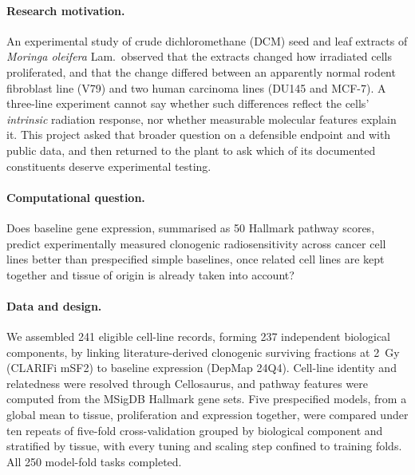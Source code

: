 \label{ch:summary}

\paragraph{Research motivation.}
An experimental study of crude dichloromethane (DCM) seed and leaf extracts of
\textit{Moringa oleifera} Lam.\ observed that the extracts changed how irradiated cells
proliferated, and that the change differed between an apparently normal rodent fibroblast
line (V79) and two human carcinoma lines (DU145 and MCF-7). A three-line experiment cannot
say whether such differences reflect the cells' \emph{intrinsic} radiation response, nor
whether measurable molecular features explain it. This project asked that broader question
on a defensible endpoint and with public data, and then returned to the plant to ask which
of its documented constituents deserve experimental testing.

\paragraph{Computational question.}
Does baseline gene expression, summarised as 50 Hallmark pathway scores, predict
experimentally measured clonogenic radiosensitivity across cancer cell lines better than
prespecified simple baselines, once related cell lines are kept together and tissue of
origin is already taken into account?

\paragraph{Data and design.}
We assembled 241 eligible cell-line records, forming 237 independent biological components,
by linking literature-derived clonogenic surviving fractions at 2~Gy (CLARIFi mSF2) to
baseline expression (DepMap 24Q4). Cell-line identity and relatedness were resolved through
Cellosaurus, and pathway features were computed from the MSigDB Hallmark gene sets. Five
prespecified models, from a global mean to tissue, proliferation and expression together,
were compared under ten repeats of five-fold cross-validation grouped by biological
component and stratified by tissue, with every tuning and scaling step confined to training
folds. All 250 model-fold tasks completed.

